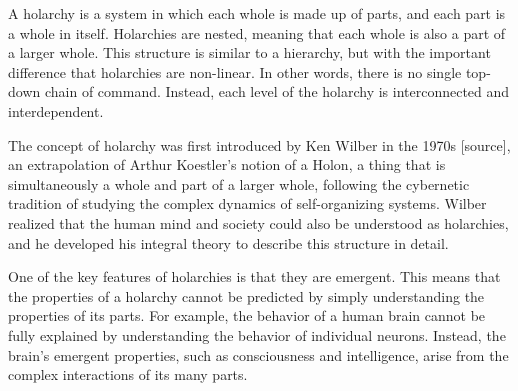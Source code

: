 A holarchy is a system in which each whole is made up of parts, and each part is a whole in itself. Holarchies are nested, meaning that each whole is also a part of a larger whole. This structure is similar to a hierarchy, but with the important difference that holarchies are non-linear. In other words, there is no single top-down chain of command. Instead, each level of the holarchy is interconnected and interdependent.

The concept of holarchy was first introduced by Ken Wilber in the 1970s [source], an extrapolation of Arthur Koestler's notion of a Holon, a thing that is simultaneously a whole and part of a larger whole, following the cybernetic tradition of studying the complex dynamics of self-organizing systems. Wilber realized that the human mind and society could also be understood as holarchies, and he developed his integral theory to describe this structure in detail.

One of the key features of holarchies is that they are emergent. This means that the properties of a holarchy cannot be predicted by simply understanding the properties of its parts. For example, the behavior of a human brain cannot be fully explained by understanding the behavior of individual neurons. Instead, the brain's emergent properties, such as consciousness and intelligence, arise from the complex interactions of its many parts.


